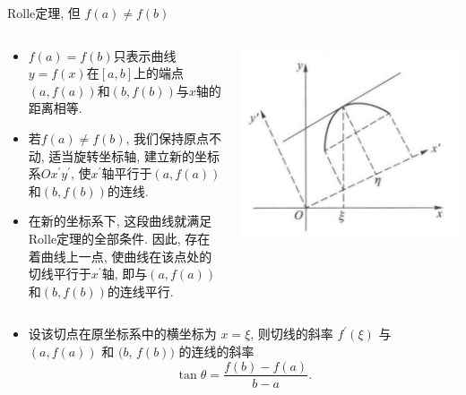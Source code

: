 \documentclass[
10pt,
aspectratio=43,
]{beamer}
\begin{document}
\begin{frame}{Rolle定理, 但 $f(a)\neq f(b)$}
	\begin{columns}[T]
		\begin{column}{0.55\textwidth}
			\begin{itemize}
				\item $f(a)=f(b)$只表示曲线$y=f(x)$在$[a, b]$上的端点$(a, f(a))$和$(b, f(b))$与$x$轴的距离相等. \pause
				\item 若$f(a) \neq f(b)$, 我们保持原点不动, 适当旋转坐标轴, 建立新的坐标系$Ox^{\prime}y^{\prime}$, 使$x^{\prime}$轴平行于$(a, f(a))$和$(b, f(b))$的连线. \pause
				\item 在新的坐标系下, 这段曲线就满足Rolle定理的全部条件. 因此, 存在着曲线上一点, 使曲线在该点处的切线平行于$x^{\prime}$轴, 即与$(a, f(a))$和$(b, f(b))$的连线平行. \pause
			\end{itemize}
		\end{column}
		\begin{column}{0.4\textwidth}
			\includegraphics[width=\textwidth]{rolle-lagrange.png}
		\end{column}
	\end{columns}
	\vspace{0.5cm}
	\begin{itemize}
		\item 设该切点在原坐标系中的横坐标为 $x=\xi$, 则切线的斜率 $f^{\prime}(\xi)$ 与 $(a, f(a))$ 和 $(b$, $f(b))$ 的连线的斜率
		      $$
			      \tan \theta=\frac{f(b)-f(a)}{b-a}.
		      $$
	\end{itemize}
\end{frame}
\end{document}
